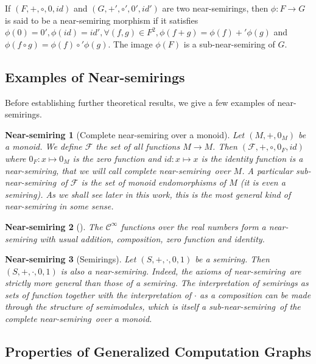\documentclass[11pt,a4paper]{article}
\newcommand{\mcal}[1]{\mathcal{#1}}
\newcommand{\Ns}{near-semiring}
\newtheorem{ns}{Near-semiring}
\theoremstyle{definition}
\begin{document}
If $(F,+,\circ,0,id)$ and $(G,+',\circ ',0',id')$ are two near-semirings, then $\phi : F \to G$ is said to be a near-semiring morphism if it satisfies $\phi(0)=0',\phi(id)=id',\forall (f,g) \in F^2, \phi(f+g) = \phi(f) +' \phi(g)$ and $ \phi(f \circ g)= \phi(f) \circ' \phi(g)$. The image $\phi(F)$ is a sub-near-semiring of $G$.



\subsection{Examples of Near-semirings}

Before establishing further theoretical results, we give a few examples of near-semirings. 

\begin{ns}[Complete near-semiring over a monoid]
\label{ns:ns_over_a_monoid}
	Let $(M,+,0_M)$ be a monoid. We define $\mcal{F}$ the set of all functions $M \to M$. Then $(\mcal{F},+,\circ,0_F,id)$ where $0_F : x \mapsto 0_M$ is the zero function and $id : x \mapsto x$ is the identity function is a near-semiring, that we will call complete \Ns\ over $M$. A particular sub-\Ns\ of $\mcal{F}$ is the set of monoid endomorphisms of $M$ (it is even a semiring). As we shall see later in this work, this is the most general kind of near-semiring in some sense.
\end{ns}

\begin{ns}[]

The $\mathcal{C}^\infty$ functions over the real numbers form a near-semiring with usual addition, composition, zero function and identity.

\end{ns}

\begin{ns}[Semirings]
\label{ns:semirings}
	Let $(S,+,\cdot,0,1)$ be a semiring. Then $(S,+,\cdot,0,1)$ is also a \Ns . Indeed, the axioms of \Ns\ are strictly more general than those of a semiring. The interpretation of semirings as sets of function together with the interpretation of $\cdot$ as a composition can be made through the structure of semimodules, which is itself a sub-\Ns\ of the complete \Ns\ over a monoid.
\end{ns}

\subsection{Properties of Generalized Computation Graphs}
\label{subsec:Properties of Generalized Computation Graphs}
\end{document}
